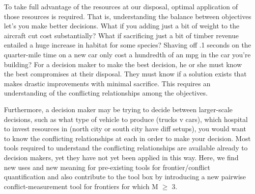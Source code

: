 To take full advantage of the resources at our disposal, optimal application of those resources is required. That is, understanding the balance between objectives let's you make better decisions. What if you adding just a bit of weight to the aircraft cut cost substantially? What if sacrificing just a bit of timber revenue entailed a huge increase in habitat for some species? Shaving off .1 seconds on the quarter-mile time on a new car only cost a hundredth of an mpg in the car you're building? For a decision maker to make the best decision, he or she must know the best compromises at their disposal. They must know if a solution exists that makes drastic improvements with minimal sacrifice. This requires an understanding of the conflicting relationships among the objectives.

Furthermore, a decision maker may be trying to decide between larger-scale decisions, such as what type of vehicle to produce (trucks v cars), which hospital to invest resources in (north city or south city have diff setups), you would want to know the conflicting relationships at each in order to make your decision. Most tools required to understand the conflicting relationships are available already to decision makers, yet they have not yet been applied in this way. Here, we find new uses and new meaning for pre-existing tools for frontier/conflict quantification and also contribute to the tool box by introducing a new pairwise conflict-measurement tool for frontiers for which M $\ge$ 3.


